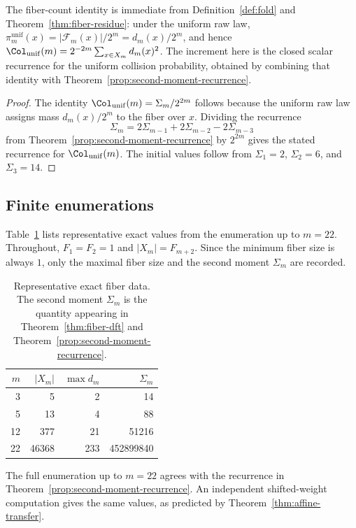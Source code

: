 \begin{remark}
The fiber-count identity is immediate from Definition~\ref{def:fold} and
Theorem~\ref{thm:fiber-residue}: under the uniform raw law,
$\pi_m^{\mathrm{unif}}(x)=|\mathcal F_m(x)|/2^m=d_m(x)/2^m$, and hence
$\Col_{\mathrm{unif}}(m)=2^{-2m}\sum_{x\in X_m}d_m(x)^2$. The increment here
is the closed scalar recurrence for the uniform collision probability,
obtained by combining that identity with
Theorem~\ref{prop:second-moment-recurrence}.
\end{remark}

\begin{proof}
The identity $\Col_{\mathrm{unif}}(m)=\Sigma_m/2^{2m}$ follows because the
uniform raw law assigns mass $d_m(x)/2^m$ to the fiber over $x$. Dividing the
recurrence
\[
\Sigma_m=2\Sigma_{m-1}+2\Sigma_{m-2}-2\Sigma_{m-3}
\]
from Theorem~\ref{prop:second-moment-recurrence} by $2^{2m}$ gives the stated
recurrence for $\Col_{\mathrm{unif}}(m)$. The initial values follow from
$\Sigma_1=2$, $\Sigma_2=6$, and $\Sigma_3=14$.
\end{proof}

\subsection{Finite enumerations}\label{sec:fiber-enumerations}

Table~\ref{tab:sanity-fibers} lists representative exact values from the enumeration up to $m=22$. Throughout, $F_1=F_2=1$ and $|X_m|=F_{m+2}$. Since the minimum fiber size is always $1$, only the maximal fiber size and the second moment $\Sigma_m$ are recorded.

\begin{table}[t]
\centering
\caption{Representative exact fiber data. The second moment $\Sigma_m$ is the quantity appearing in Theorem~\ref{thm:fiber-dft} and Theorem~\ref{prop:second-moment-recurrence}.}
\label{tab:sanity-fibers}
\renewcommand{\arraystretch}{1.15}
\begin{tabular}{rrrr}
\toprule
$m$ & $|X_m|$ & $\max d_m$ & $\Sigma_m$ \\
\midrule
3 & 5 & 2 & 14 \\
5 & 13 & 4 & 88 \\
12 & 377 & 21 & 51216 \\
22 & 46368 & 233 & 452899840 \\
\bottomrule
\end{tabular}
\end{table}

The full enumeration up to $m=22$ agrees with the recurrence in Theorem~\ref{prop:second-moment-recurrence}. An independent shifted-weight computation gives the same values, as predicted by Theorem~\ref{thm:affine-transfer}.
